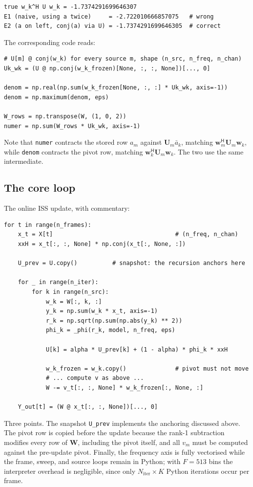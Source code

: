 \documentclass[11pt,a4paper]{article}
\newcommand{\W}{\boldsymbol{W}}
\newcommand{\U}{\boldsymbol{U}}
\newcommand{\w}{\boldsymbol{w}}
\newcommand{\herm}{^{\mathsf{H}}}
\begin{document}
\begin{lstlisting}
true w_k^H U w_k = -1.7374291699646307
E1 (naive, using a twice)     = -2.722010666857075   # wrong
E2 (a on left, conj(a) via U) = -1.7374291699646305  # correct
\end{lstlisting}

The corresponding code reads:

\begin{lstlisting}
# U[m] @ conj(w_k) for every source m, shape (n_src, n_freq, n_chan)
Uk_wk = (U @ np.conj(w_k_frozen)[None, :, :, None])[..., 0]

denom = np.real(np.sum(w_k_frozen[None, :, :] * Uk_wk, axis=-1))
denom = np.maximum(denom, eps)

W_rows = np.transpose(W, (1, 0, 2))
numer = np.sum(W_rows * Uk_wk, axis=-1)
\end{lstlisting}

Note that \verb|numer| contracts the stored row $a_m$ against
$\U_m\bar{a}_k$, matching $\w_m\herm\U_m\w_k$, while \verb|denom| contracts the
pivot row, matching $\w_k\herm\U_m\w_k$. The two use the same intermediate.

\subsection{The core loop}

The online ISS update, with commentary:

\begin{lstlisting}
for t in range(n_frames):
    x_t = X[t]                                   # (n_freq, n_chan)
    xxH = x_t[:, :, None] * np.conj(x_t[:, None, :])

    U_prev = U.copy()          # snapshot: the recursion anchors here

    for _ in range(n_iter):
        for k in range(n_src):
            w_k = W[:, k, :]
            y_k = np.sum(w_k * x_t, axis=-1)
            r_k = np.sqrt(np.sum(np.abs(y_k) ** 2))
            phi_k = _phi(r_k, model, n_freq, eps)

            U[k] = alpha * U_prev[k] + (1 - alpha) * phi_k * xxH

            w_k_frozen = w_k.copy()              # pivot must not move
            # ... compute v as above ...
            W -= v_t[:, :, None] * w_k_frozen[:, None, :]

    Y_out[t] = (W @ x_t[:, :, None])[..., 0]
\end{lstlisting}

Three points. The snapshot \verb|U_prev| implements the anchoring discussed
above. The pivot row is copied before the update because the rank-1 subtraction
modifies every row of $\W$, including the pivot itself, and all $v_m$ must be
computed against the pre-update pivot. Finally, the frequency axis is fully
vectorised while the frame, sweep, and source loops remain in Python; with
$F = 513$ bins the interpreter overhead is negligible, since only
$N_{\text{iter}}\times K$ Python iterations occur per frame.
\end{document}
